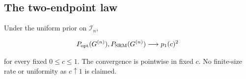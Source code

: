 \subsection{The two-endpoint law}\label{the-two-endpoint-law}

\begin{theorem}\label{thm:unknown-length}
Under the uniform prior on \(\mathcal I_n\),

\begin{equation}\label{eq:unknown-length-limit}
P_{\rm opt}(G^{(n)}),P_{\rm SRM}(G^{(n)})
\longrightarrow p_1(c)^2
\end{equation}

for every fixed \(0\le c\le1\).
The convergence is pointwise in fixed \(c\). No finite-size rate or
uniformity as \(c\uparrow1\) is claimed.
\end{theorem}


